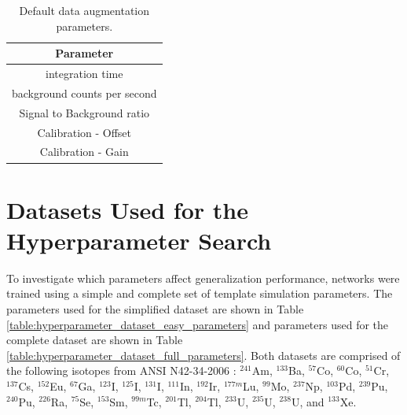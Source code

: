 \begin{table}[H]
\centering
\caption{Default data augmentation parameters.}
\begin{tabular}{c}
Parameter \\ \hline
integration time \\ 
background counts per second \\ 
Signal to Background ratio \\ 
Calibration - Offset \\ 
Calibration - Gain \\ 
\end{tabular}
\label{table:all_variable_simulation_parameters}
\end{table}



\section{Datasets Used for the Hyperparameter Search}

To investigate which parameters affect generalization performance, networks were trained using a simple and complete set of template simulation parameters. The parameters used for the simplified dataset are shown in Table \ref{table:hyperparameter_dataset_easy_parameters} and parameters used for the complete dataset are shown in Table \ref{table:hyperparameter_dataset_full_parameters}. Both datasets are comprised of the following isotopes from ANSI N42-34-2006 \cite{ANSI}: $^{241}$Am, $^{133}$Ba, $^{57}$Co, $^{60}$Co, $^{51}$Cr, $^{137}$Cs, $^{152}$Eu, $^{67}$Ga, $^{123}$I, $^{125}$I, $^{131}$I, $^{111}$In, $^{192}$Ir, $^{177m}$Lu, $^{99}$Mo, $^{237}$Np, $^{103}$Pd, $^{239}$Pu, $^{240}$Pu, $^{226}$Ra, $^{75}$Se, $^{153}$Sm, $^{99m}$Tc, $^{201}$Tl, $^{204}$Tl, $^{233}$U, $^{235}$U, $^{238}$U, and $^{133}$Xe.

